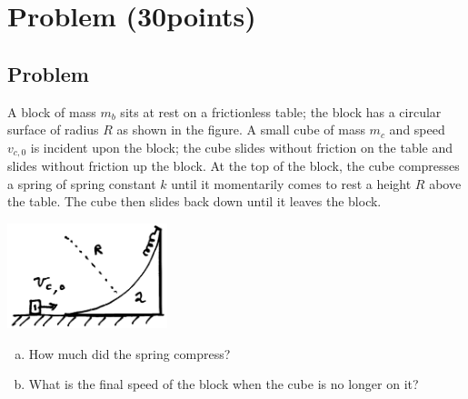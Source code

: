 \documentclass[solutions]{esg8012exam}
\date{\today }
\begin{document}
\section{Problem \thesection\space(30\space points)}
\subsection{Problem}
  A block of mass $m_b$ sits at rest on a frictionless table; the block has a circular surface of radius $R$ as shown in the figure. A small cube of mass $m_c$ and speed $v_{c,0}$ is incident upon the block; the cube slides without friction on the table and slides without friction up the block. At the top of the block, the cube compresses a spring of spring constant $k$ until it momentarily comes to rest a height $R$ above the table. The cube then slides back down until it leaves the block.
  \begin{center}\includegraphics[width=0.35\textwidth]{exam2_p1_1}\end{center}
  \begin{enumerate}[(a)]
    \item How much did the spring compress?
    \item What is the final speed of the block when the cube is no longer on it?
  \end{enumerate}
\end{document}
